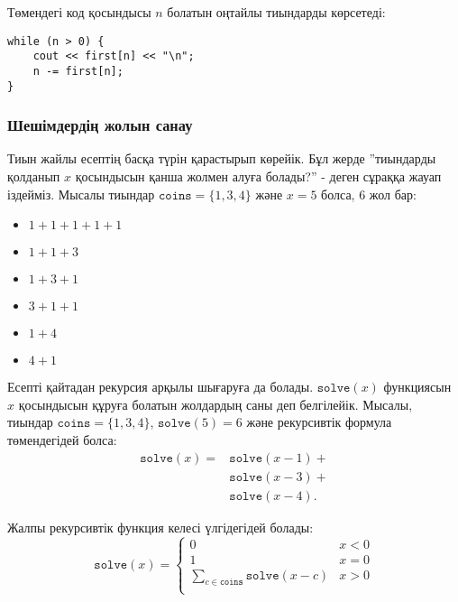 Төмендегі код қосындысы $n$ болатын
оңтайлы тиындарды көрсетеді:
\begin{lstlisting}
while (n > 0) {
    cout << first[n] << "\n";
    n -= first[n];
}
\end{lstlisting}

\subsubsection{Шешімдердің жолын санау}

Тиын жайлы есептің басқа түрін қарастырып 
көрейік. Бұл жерде ''тиындарды қолданып $x$ қосындысын
қанша жолмен алуға болады?'' - деген сұраққа жауап іздейміз. 
Мысалы тиындар $\texttt{coins}=\{1,3,4\}$ және
$x=5$ болса, 6 жол бар:

\begin{multicols}{2}
\begin{itemize}
\item $1+1+1+1+1$
\item $1+1+3$
\item $1+3+1$
\item $3+1+1$
\item $1+4$
\item $4+1$
\end{itemize}
\end{multicols}

Есепті қайтадан рекурсия арқылы шығаруға да болады.
$\texttt{solve}(x)$ функциясын $x$ қосындысын 
құруға болатын жолдардың саны деп белгілейік. 
Мысалы, тиындар $\texttt{coins}=\{1,3,4\}$,  $\texttt{solve}(5)=6$ және
рекурсивтік формула төмендегідей болса:
\begin{equation*}
\begin{split}
\texttt{solve}(x) = & \texttt{solve}(x-1) + \\
                    & \texttt{solve}(x-3) + \\
                    & \texttt{solve}(x-4)  .
\end{split}
\end{equation*}

Жалпы рекурсивтік функция келесі үлгідегідей болады:
\begin{equation*}
    \texttt{solve}(x) = \begin{cases}
               0               & x < 0\\
               1               & x = 0\\
               \sum_{c \in \texttt{coins}} \texttt{solve}(x-c) & x > 0 \\
           \end{cases}
\end{equation*}

